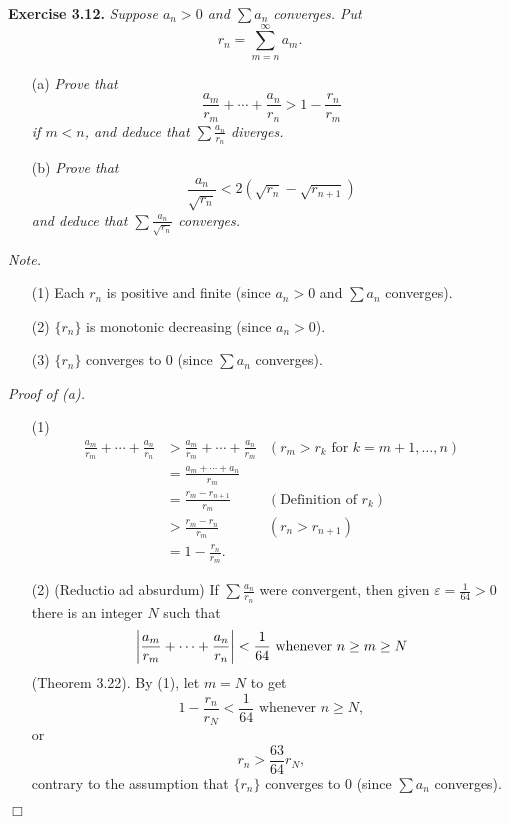 \documentclass{article}
\begin{document}



\textbf{Exercise 3.12.}
\emph{Suppose $a_n > 0$ and $\sum a_n$ converges.
Put
$$r_n = \sum_{m=n}^{\infty} a_m.$$}
\begin{enumerate}
\item[(a)]
\emph{Prove that
$$\frac{a_m}{r_m} + \cdots + \frac{a_n}{r_n} > 1 - \frac{r_n}{r_m}$$
if $m < n$, and deduce that $\sum \frac{a_n}{r_n}$ diverges.}
\item[(b)]
\emph{Prove that
$$\frac{a_n}{\sqrt{r_n}} < 2(\sqrt{r_n} - \sqrt{r_{n+1}})$$
and deduce that $\sum \frac{a_n}{\sqrt{r_n}}$ converges.} \\
\end{enumerate}

\emph{Note.}
\begin{enumerate}
\item[(1)]
Each $r_n$ is positive and finite (since $a_n > 0$ and $\sum a_n$ converges).
\item[(2)]
$\{r_n\}$ is monotonic decreasing (since $a_n > 0$).
\item[(3)]
$\{r_n\}$ converges to $0$ (since $\sum a_n$ converges). \\
\end{enumerate}

\emph{Proof of (a).}
\begin{enumerate}
\item[(1)]
\begin{align*}
  \frac{a_m}{r_m} + \cdots + \frac{a_n}{r_n}
  &> \frac{a_m}{r_m} + \cdots + \frac{a_n}{r_m}
    &(\text{$r_m > r_k$ for $k=m+1,\ldots,n$}) \\
  &= \frac{a_m + \cdots + a_n}{r_m} \\
  &= \frac{r_m - r_{n+1}}{r_m}
    &(\text{Definition of $r_k$}) \\
  &> \frac{r_m - r_{n}}{r_m}
    &(r_n > r_{n+1}) \\
  &= 1 - \frac{r_n}{r_m}.
\end{align*}
\item[(2)]
(Reductio ad absurdum)
If $\sum \frac{a_n}{r_n}$ were convergent,
then given $\varepsilon = \frac{1}{64} > 0$
there is an integer $N$ such that
$$\abs{\frac{a_m}{r_m} + \cdots + \frac{a_n}{r_n}} < \frac{1}{64}
\text{ whenever } n \geq m \geq N$$
(Theorem 3.22). By (1), let $m = N$ to get
$$1 - \frac{r_n}{r_N} < \frac{1}{64}
\text{ whenever } n \geq N,$$
or $$r_n > \frac{63}{64} r_N,$$
contrary to the assumption that
$\{r_n\}$ converges to $0$ (since $\sum a_n$ converges).
\end{enumerate}
$\Box$ \\
\end{document}

